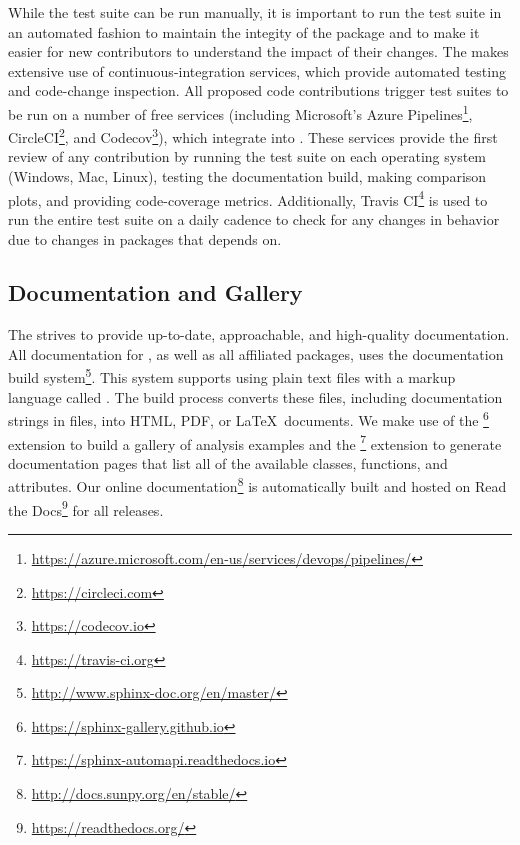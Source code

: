 While the test suite can be run manually, it is important to run the test suite in an automated fashion to maintain the integity of the package and to make it easier for new contributors to understand the impact of their changes.
The \sunpyproj makes extensive use of continuous-integration services, which provide automated testing and code-change inspection.
All proposed code contributions trigger test suites to be run on a number of free services (including
Microsoft's Azure Pipelines\footnote{\url{https://azure.microsoft.com/en-us/services/devops/pipelines/}}, CircleCI\footnote{\url{https://circleci.com}}, and Codecov\footnote{\url{https://codecov.io}}), which integrate into \github.
These services provide the first review of any contribution by running the test suite on each operating system (Windows, Mac, Linux), testing the documentation build, making comparison plots, and providing code-coverage metrics.
Additionally, Travis CI\footnote{\url{https://travis-ci.org}} is used to run the entire test suite on a daily cadence to check for any changes in behavior due to changes in packages that \sunpypkg depends on.

\subsection{Documentation and Gallery}
\label{sec:docs}

The \sunpyproj strives to provide up-to-date, approachable, and high-quality documentation.
All documentation for \sunpypkg, as well as all affiliated packages, uses the  documentation build system\footnote{\url{http://www.sphinx-doc.org/en/master/}}.
This system supports using plain text files with a markup language called .
The build process converts these files, including documentation strings in \python files, into HTML, PDF, or \LaTeX\ documents.
We make use of the \footnote{\url{https://sphinx-gallery.github.io}} extension to build a gallery of analysis examples and the \footnote{\url{https://sphinx-automapi.readthedocs.io}} extension to generate documentation pages that list all of the available classes, functions, and attributes.
Our online documentation\footnote{\url{http://docs.sunpy.org/en/stable/}} is automatically built and hosted on Read the Docs\footnote{\url{https://readthedocs.org/}} for all releases.

